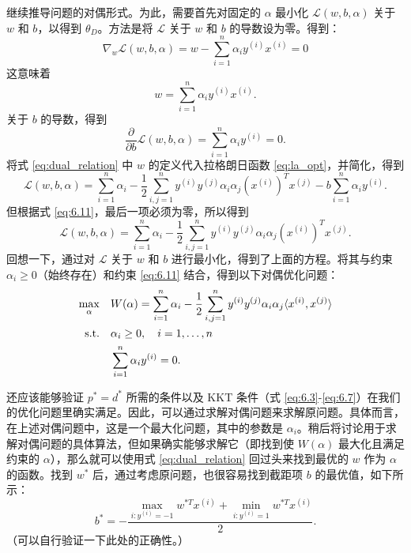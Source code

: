 继续推导问题的对偶形式。为此，需要首先对固定的 $\alpha$ 最小化 $\mathcal{L}(w, b, \alpha)$ 关于 $w$ 和 $b$，以得到 $\theta_D$。方法是将 $\mathcal{L}$ 关于 $w$ 和 $b$ 的导数设为零。得到：
\[
    \nabla_w \mathcal{L}(w, b, \alpha) = w - \sum_{i=1}^n \alpha_i y^{(i)} x^{(i)} = 0
\]
这意味着
\begin{equation}
    w = \sum_{i=1}^n \alpha_i y^{(i)} x^{(i)}. \label{eq:dual_relation}
\end{equation}
关于 $b$ 的导数，得到
\begin{equation}
    \frac{\partial}{\partial b} \mathcal{L}(w, b, \alpha) = \sum_{i=1}^n \alpha_i y^{(i)} = 0. \label{eq:6.11}
\end{equation}
将式 \eqref{eq:dual_relation} 中 $w$ 的定义代入拉格朗日函数 \eqref{eq:la_opt}，并简化，得到
\[
    \mathcal{L}(w, b, \alpha) = \sum_{i=1}^n \alpha_i - \frac{1}{2} \sum_{i,j=1}^n y^{(i)} y^{(j)} \alpha_i \alpha_j (x^{(i)})^T x^{(j)} - b \sum_{i=1}^n \alpha_i y^{(i)}.
\]
但根据式 \eqref{eq:6.11}，最后一项必须为零，所以得到
\[
    \mathcal{L}(w, b, \alpha) = \sum_{i=1}^n \alpha_i - \frac{1}{2} \sum_{i,j=1}^n y^{(i)} y^{(j)} \alpha_i \alpha_j (x^{(i)})^T x^{(j)}.
\]
回想一下，通过对 $\mathcal{L}$ 关于 $w$ 和 $b$ 进行最小化，得到了上面的方程。将其与约束 $\alpha_i \ge 0$（始终存在）和约束 \eqref{eq:6.11} 结合，得到以下对偶优化问题：
\begin{align}
    \max_\alpha \quad &W(\alpha) = \sum_{i=1}^n \alpha_i - \frac{1}{2} \sum_{i,j=1}^n y^{(i)} y^{(j)} \alpha_i \alpha_j \langle x^{(i)}, x^{(j)} \rangle \label{eq:dual_opt} \\
    \text{s.t.} \quad & \alpha_i \ge 0, \quad i=1,\dots,n \notag\\
     & \sum_{i=1}^n \alpha_i y^{(i)} = 0. \notag
\end{align}

还应该能够验证 $p^* = d^*$ 所需的条件以及 KKT 条件（式 \eqref{eq:6.3}-\eqref{eq:6.7}）在我们的优化问题里确实满足。因此，可以通过求解对偶问题来求解原问题。具体而言，在上述对偶问题中，这是一个最大化问题，其中的参数是 $\alpha_i$。稍后将讨论用于求解对偶问题的具体算法，但如果确实能够求解它（即找到使 $W(\alpha)$ 最大化且满足约束的 $\alpha$），那么就可以使用式 \eqref{eq:dual_relation} 回过头来找到最优的 $w$ 作为 $\alpha$ 的函数。找到 $w^*$ 后，通过考虑原问题，也很容易找到截距项 $b$ 的最优值，如下所示：
\begin{equation}
    b^* = - \frac{\max_{i:y^{(i)}=-1} w^{*T} x^{(i)} + \min_{i:y^{(i)}=1} w^{*T} x^{(i)}}{2}. \label{eq:6.13}
\end{equation}
（可以自行验证一下此处的正确性。）

